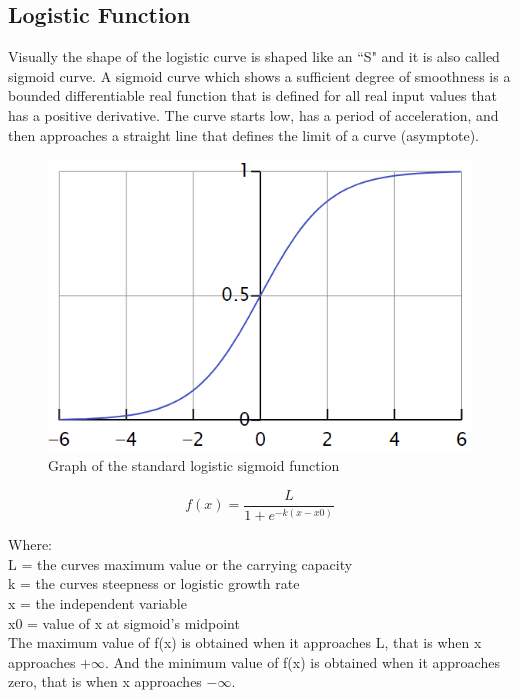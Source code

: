 \documentclass[conference]{IEEEtran}
\begin{document}
\subsection{Logistic Function}
Visually the shape of the logistic curve is shaped like an “S" and it is also called sigmoid curve.
A sigmoid curve which shows a sufficient degree of smoothness is a bounded differentiable real function that is defined for all real input values that has a positive derivative. \cite{bb7} The curve starts low, has a period of acceleration, and then approaches a straight line that defines the limit of a curve (asymptote).

\begin{figure}[h]
    \centering
    \includegraphics[scale=0.62]{figs/Lfunction.png}
    \caption{Graph of the standard logistic sigmoid function \cite{img}}
    \label{dabc}        
\end{figure}

\begin{equation} 
\label{equ2}
f(x) = \frac{L}{1 + e{^{-k(x-x0)}}}
\end{equation} 


Where:\\
L = the curves maximum value or the carrying capacity\\
k = the curves steepness or logistic growth rate\\
x = the independent variable\\
x0 = value of x at sigmoid’s midpoint\\

The maximum value of f(x) is obtained when it approaches L, that is when x approaches $+\infty$. And the minimum value of f(x) is obtained when it approaches zero, that is when x approaches $-\infty$.
\end{document}
